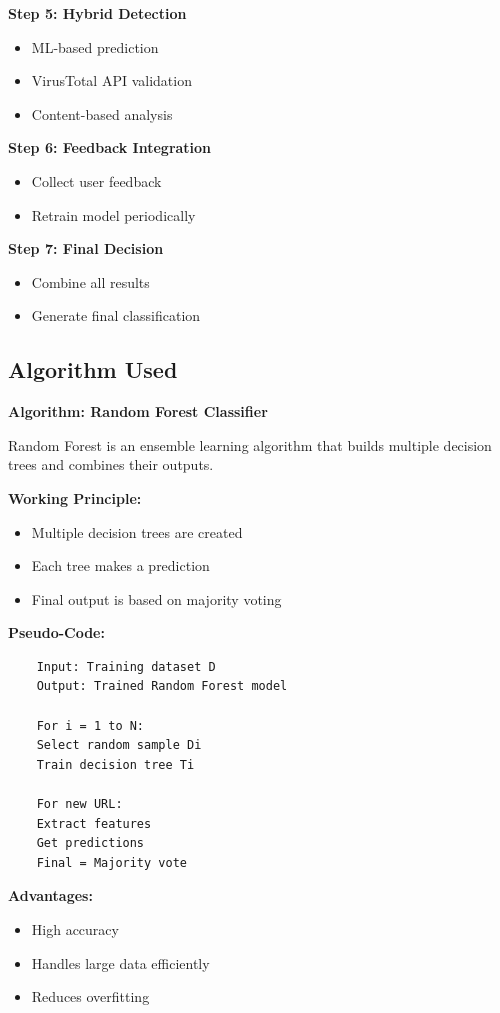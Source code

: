 \textbf{Step 5: Hybrid Detection}
\begin{itemize}
	\item ML-based prediction
	\item VirusTotal API validation
	\item Content-based analysis
\end{itemize}

\textbf{Step 6: Feedback Integration}
\begin{itemize}
	\item Collect user feedback
	\item Retrain model periodically
\end{itemize}

\textbf{Step 7: Final Decision}
\begin{itemize}
	\item Combine all results
	\item Generate final classification
\end{itemize}

\subsection{Algorithm Used}

\textbf{Algorithm: Random Forest Classifier}

Random Forest is an ensemble learning algorithm that builds multiple decision trees and combines their outputs.

\textbf{Working Principle:}
\begin{itemize}
	\item Multiple decision trees are created
	\item Each tree makes a prediction
	\item Final output is based on majority voting
\end{itemize}

\textbf{Pseudo-Code:}

\begin{verbatim}
	Input: Training dataset D
	Output: Trained Random Forest model
	
	For i = 1 to N:
	Select random sample Di
	Train decision tree Ti
	
	For new URL:
	Extract features
	Get predictions
	Final = Majority vote
\end{verbatim}

\textbf{Advantages:}
\begin{itemize}
	\item High accuracy
	\item Handles large data efficiently
	\item Reduces overfitting
\end{itemize}

